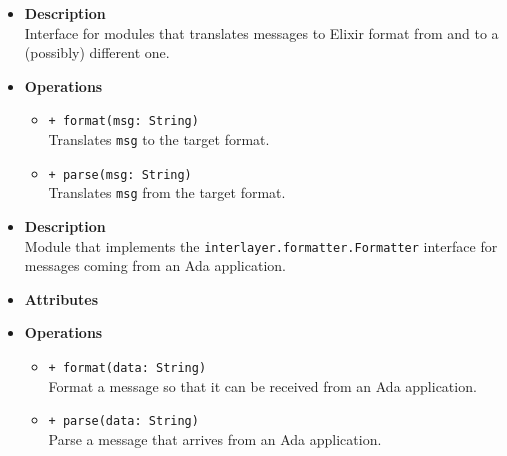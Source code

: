 \FloatBarrier
\begin{itemize}
  \item \textbf{Description} \\
    Interface for modules that translates messages to Elixir format from and
    to a (possibly) different one.
  \item \textbf{Operations}
  \begin{itemize}
    \item \texttt{+ format(msg: String)} \\
    Translates \texttt{msg} to the target format.
    \item \texttt{+ parse(msg: String)} \\
    Translates \texttt{msg} from the target format.
  \end{itemize}
\end{itemize}

\FloatBarrier
\begin{itemize}
  \item \textbf{Description} \\
    Module that implements the \texttt{interlayer.formatter.Formatter}
    interface for messages coming from an Ada application.
  \item \textbf{Attributes}
  \item \textbf{Operations}
  \begin{itemize}
    \item \texttt{+ format(data: String)} \\
    Format a message so that it can be received from an Ada application.
    \item \texttt{+ parse(data: String)} \\
    Parse a message that arrives from an Ada application.
  \end{itemize}
\end{itemize}

